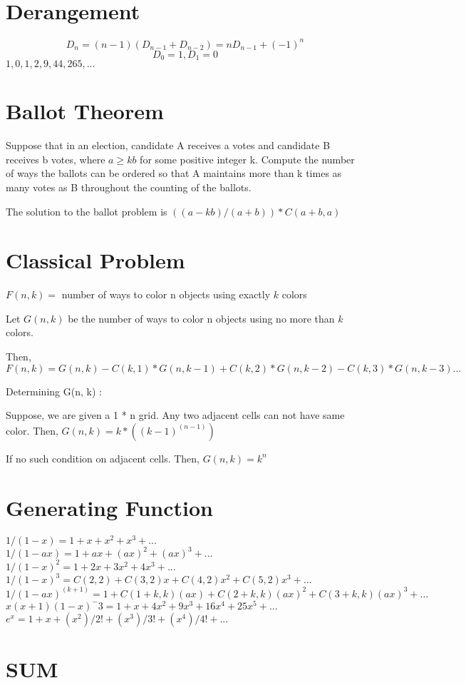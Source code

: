 \section{Derangement}
\[ D_n = (n-1) (D_{n-1} + D_{n-2}) = nD_{n-1} + (-1)^n \]
\[ D_0 = 1, D_1 = 0 \]  
$ 1, 0, 1, 2, 9, 44, 265, ... $

\section{Ballot Theorem}

Suppose that in an election, candidate A receives
a votes and candidate B receives b votes, where $a \geq kb$ for some positive
integer k. Compute the number of ways the ballots can be ordered so that
A maintains more than k times as many votes as B throughout the counting
of the ballots.

The solution to the ballot problem is $((a - kb)/(a+b)) * C(a+b, a)$

\section{Classical Problem}
$ F(n, k) = $ number of ways to color n objects using exactly $ k $ colors

Let $ G(n, k) $ be the number of ways to color n objects using no more than $ k $ colors.

Then, $ F(n, k) = G(n, k) - C(k, 1) * G(n, k-1) + C(k, 2) * G(n, k-2) - C(k, 3) * G(n, k-3) ... $

Determining G(n, k) :

Suppose, we are given a 1 * n grid. Any two adjacent cells can not have same color.
Then, $G(n, k) = k * ((k-1)^(n-1))$

If no such condition on adjacent cells.
Then, $G(n, k) = k ^ n$


\section{Generating Function}

$ 1/(1 - x) = 1 + x + x^2 + x^3 + ... $
$ 1/(1 - ax) = 1 + ax + (ax)^2 + (ax)^3 + ... $
$ 1/(1 - x)^2 = 1 + 2x + 3x^2 + 4x^3 + ... $
$ 1/(1 - x)^3 = C(2, 2) + C(3, 2)x + C(4, 2)x^2 + C(5, 2)x^3 + ... $
$ 1/(1 - ax)^(k + 1) = 1 + C(1 + k, k)(ax) + C(2 + k, k)(ax)^2 + C(3 + k, k)(ax)^3 + ... $
$ x(x + 1)(1 - x)^-3 = 1 + x + 4x^2 + 9x^3 + 16x^4 + 25x^5 + ... $
$ e^x = 1 + x + (x^2)/2! + (x^3)/3! + (x^4)/4! + ... $

\section{SUM}

